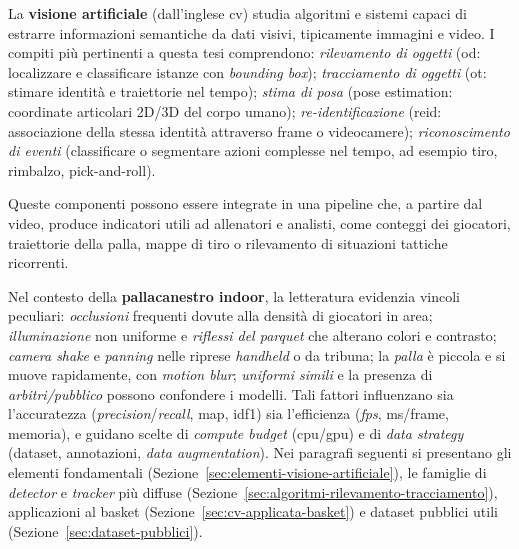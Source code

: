 \documentclass[12pt,a4paper,openright,twoside]{book}
\begin{document}
La \textbf{visione artificiale} (dall'inglese \ac{cv}) studia algoritmi e 
sistemi capaci di estrarre informazioni semantiche da dati visivi, tipicamente immagini e video. 
I compiti più pertinenti a questa tesi comprendono: \emph{rilevamento di oggetti}
(\ac{od}: localizzare e classificare istanze con \emph{bounding box});
\emph{tracciamento di oggetti} (\ac{ot}: stimare identità e traiettorie nel tempo);
\emph{stima di posa} (pose estimation: coordinate articolari 2D/3D del corpo umano); \emph{re-identificazione} 
(\ac{reid}: associazione della stessa identità attraverso frame o videocamere); \emph{riconoscimento di eventi}
(classificare o segmentare azioni complesse nel tempo, ad esempio tiro, rimbalzo, pick-and-roll).

Queste componenti possono essere integrate in una pipeline che, a partire dal video, produce indicatori utili ad allenatori e analisti, come conteggi dei giocatori, traiettorie della palla, 
mappe di tiro o rilevamento di situazioni tattiche ricorrenti.


Nel contesto della \textbf{pallacanestro indoor}, la letteratura evidenzia vincoli peculiari: \emph{occlusioni} frequenti 
dovute alla densità di giocatori in area; \emph{illuminazione} non uniforme e \emph{riflessi del parquet} che 
alterano colori e contrasto; \emph{\textit{camera shake}} e \emph{panning} nelle riprese \emph{handheld} o 
da tribuna; la \emph{palla} è piccola e si muove rapidamente, con \emph{motion blur}; \emph{uniformi simili} 
e la presenza di \emph{arbitri/pubblico} possono confondere i modelli. Tali fattori influenzano sia l'accuratezza 
(\emph{precision}/\emph{recall}, \ac{map}, \ac{idf1}) sia l'efficienza (\emph{\ac{fps}}, ms/frame, memoria), 
e guidano scelte di \textit{compute budget} (\ac{cpu}/\ac{gpu}) e di \textit{data strategy} 
(dataset, annotazioni, \emph{data augmentation}). Nei paragrafi seguenti si presentano gli elementi fondamentali 
 (Sezione~\ref{sec:elementi-visione-artificiale}), le famiglie di \emph{detector} e \emph{tracker} più diffuse 
(Sezione~\ref{sec:algoritmi-rilevamento-tracciamento}), applicazioni al basket (Sezione~\ref{sec:cv-applicata-basket})
e dataset pubblici utili (Sezione~\ref{sec:dataset-pubblici}).


\end{document}

